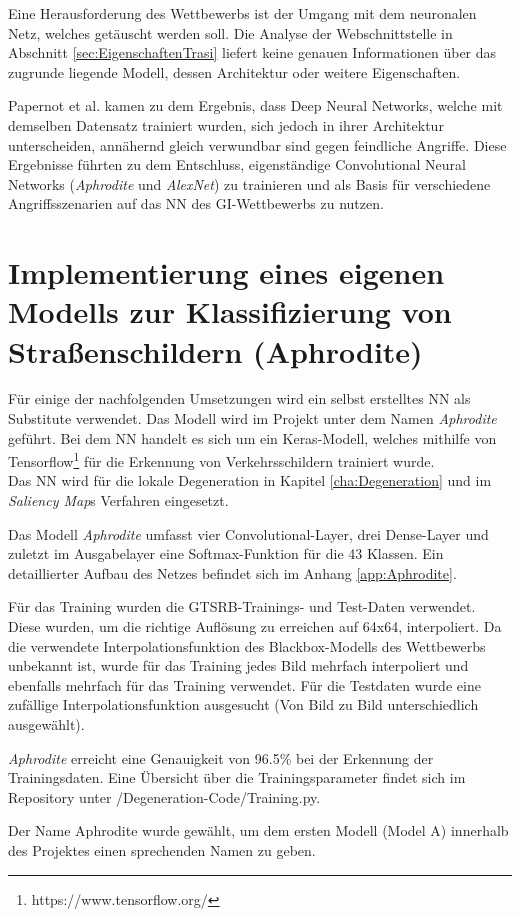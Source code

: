 \label{sec:TrasiModell}
Eine Herausforderung des Wettbewerbs ist der Umgang mit dem neuronalen Netz, welches getäuscht werden soll. 
Die Analyse der Webschnittstelle in Abschnitt \ref{sec:EigenschaftenTrasi} liefert keine genauen Informationen über das zugrunde liegende Modell, dessen Architektur oder weitere Eigenschaften.

Papernot et al. \cite{papernot_+_2016} kamen zu dem Ergebnis, dass Deep Neural Networks, welche mit demselben Datensatz trainiert wurden, sich jedoch in ihrer Architektur unterscheiden, annähernd gleich verwundbar sind gegen feindliche Angriffe.
Diese Ergebnisse führten zu dem Entschluss, eigenständige Convolutional Neural Networks (\textit{Aphrodite} und \textit{AlexNet}) zu trainieren und als Basis für verschiedene Angriffsszenarien auf das \ac{NN} des \ac{GI}-Wettbewerbs zu nutzen.

\section{Implementierung eines eigenen Modells zur Klassifizierung von Straßenschildern (Aphrodite)}
\label{sec:ImplAphrodite}
Für einige der nachfolgenden Umsetzungen wird ein selbst erstelltes \ac{NN} als Substitute verwendet. 
Das Modell wird im Projekt unter dem Namen \textit{Aphrodite} geführt. 
Bei dem \ac{NN} handelt es sich um ein Keras-Modell, welches mithilfe von Tensorflow\footnote{https://www.tensorflow.org/} für die Erkennung von Verkehrsschildern trainiert wurde. \\
Das \ac{NN} wird für die lokale Degeneration in Kapitel \ref{cha:Degeneration} und im \textit{Saliency Map}s Verfahren eingesetzt.

Das Modell \textit{Aphrodite} umfasst vier Convolutional-Layer, drei Dense-Layer und zuletzt im Ausgabelayer eine Softmax-Funktion für die 43 Klassen. 
Ein detaillierter Aufbau des Netzes befindet sich im Anhang \ref{app:Aphrodite}.

Für das Training wurden die \ac{GTSRB}-Trainings- und Test-Daten verwendet. 
Diese wurden, um die richtige Auflösung zu erreichen auf 64x64, interpoliert. Da die verwendete Interpolationsfunktion des Blackbox-Modells des Wettbewerbs unbekannt ist, wurde für das Training jedes Bild mehrfach interpoliert und ebenfalls mehrfach für das Training verwendet. 
Für die Testdaten wurde eine zufällige Interpolationsfunktion ausgesucht (Von Bild zu Bild unterschiedlich ausgewählt).

\textit{Aphrodite} erreicht eine Genauigkeit von 96.5\% bei der Erkennung der Trainingsdaten. 
Eine Übersicht über die Trainingsparameter findet sich im Repository unter /Degeneration-Code/Training.py. 

Der Name Aphrodite wurde gewählt, um dem ersten Modell (Model A) innerhalb des Projektes einen sprechenden Namen zu geben.